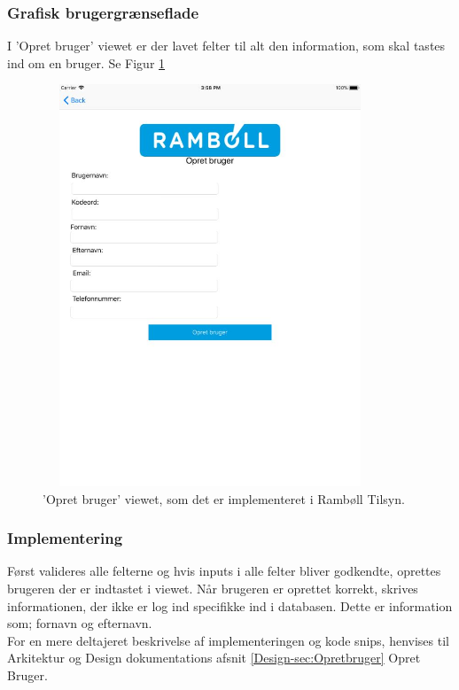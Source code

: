 \subsubsection{Grafisk brugergrænseflade}
I 'Opret bruger' viewet er der lavet felter til alt den information, som skal tastes ind om en bruger. Se Figur \ref{fig:OpretBrugerView}
\begin{figure}[H] %
	\centering
	\includegraphics[height=12cm, width=10cm]{Design/Applikation/OpretBruger/OpretBrugerView}
	\caption{'Opret bruger' viewet, som det er implementeret i Rambøll Tilsyn.}
	\label{fig:OpretBrugerView}
\end{figure}

\subsubsection{Implementering}
Først valideres alle felterne og hvis inputs i alle felter bliver godkendte, oprettes brugeren der er indtastet i viewet. Når brugeren er oprettet korrekt, skrives informationen, der ikke er log ind specifikke ind i databasen. Dette er information som; fornavn og efternavn. \\
For en mere deltajeret beskrivelse af implementeringen og kode snips, henvises til Arkitektur og Design dokumentations afsnit \ref{Design-sec:Opretbruger} Opret Bruger.


\clearpage